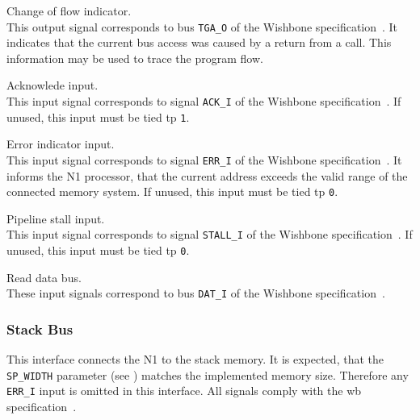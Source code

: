 \begin{description}[style=nextline]
\item[\texttt{pbus\_tga\_cof\_eow\_o}] Change of flow indicator. \\   
  This output signal corresponds to bus \texttt{TGA\_O} of the Wishbone specification~\cite{wishbone}.
  It indicates that the current bus access was caused by a return from a \gls{call}.
  This information may be used to trace the program flow.

\item[\texttt{pbus\_ack\_i}] Acknowlede input. \\   
  This input signal corresponds to signal \texttt{ACK\_I} of the Wishbone specification~\cite{wishbone}.
  If unused, this input must be tied tp \texttt{1}.

\item[\texttt{pbus\_err\_i}] Error indicator input. \\  
  This input signal corresponds to signal \texttt{ERR\_I} of the Wishbone specification~\cite{wishbone}.
  It informs the N1 processor, that the current address exceeds the valid range of the connected
  memory system. 
  If unused, this input must be tied tp \texttt{0}.
  
\item[\texttt{pbus\_stall\_i}] Pipeline stall input. \\
  This input signal corresponds to signal \texttt{STALL\_I} of the Wishbone specification~\cite{wishbone}.
  If unused, this input must be tied tp \texttt{0}.

\item[\texttt{pbus\_dat\_i}] Read data bus. \\ 
  These input signals correspond to bus \texttt{DAT\_I} of the Wishbone specification~\cite{wishbone}.

\end{description}

\subsubsection{Stack Bus}
\label{integration:if:sbus}
This interface connects the N1 to the stack memory.
It is expected, that the \texttt{SP\_WIDTH} parameter (see ) matches the
implemented memory size. Therefore any \texttt{ERR\_I} input is omitted in this interface.
All signals comply with the \gls{wb} specification~\cite{wishbone}.

